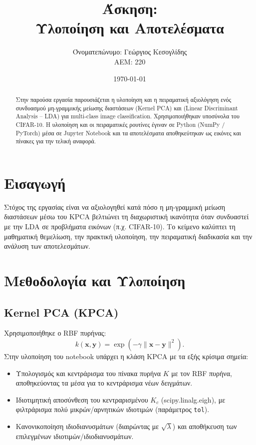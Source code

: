 \documentclass[a4paper,11pt]{article}
\title{Άσκηση: \lt{KPCA + LDA} \\ Υλοποίηση και Αποτελέσματα}
\author{Όνοματεπώνυμο: Γεώργιος Κεσογλίδης \\ ΑΕΜ: 220}
\date{\today}
\newcommand{\lt}[1]{\foreignlanguage{english}{#1}}
\begin{document}
\maketitle

\begin{abstract}
Στην παρούσα εργασία παρουσιάζεται η υλοποίηση και η πειραματική αξιολόγηση ενός συνδυασμού μη-γραμμικής μείωσης διαστάσεων (\lt{Kernel PCA}) και (\lt{Linear Discriminant Analysis -- LDA}) για \lt{multi-class image classification}. Χρησιμοποιήθηκαν υποσύνολα του \lt{CIFAR-10}. Η υλοποίηση και οι πειραματικές ρουτίνες έγιναν σε \lt{Python} (\lt{NumPy} / \lt{PyTorch}) μέσα σε \lt{Jupyter Notebook} και τα αποτελέσματα αποθηκεύτηκαν ως εικόνες και πίνακες για την τελική αναφορά.
\end{abstract}

\tableofcontents
\newpage

\section{Εισαγωγή}
Στόχος της εργασίας είναι να αξιολογηθεί κατά πόσο η μη-γραμμική μείωση διαστάσεων μέσω του \lt{KPCA} βελτιώνει τη διαχωριστική ικανότητα όταν συνδυαστεί με την \lt{LDA} σε προβλήματα εικόνων (π.χ. \lt{CIFAR-10}). Το κείμενο καλύπτει τη μαθηματική θεμελίωση, την πρακτική υλοποίηση, την πειραματική διαδικασία και την ανάλυση των αποτελεσμάτων.

\section{Μεθοδολογία και Υλοποίηση}
\subsection{\lt{Kernel PCA} (\lt{KPCA})}
Χρησιμοποιήθηκε ο \lt{RBF} πυρήνας:
\begin{equation}
k(\mathbf{x},\mathbf{y}) = \exp(-\gamma \|\mathbf{x}-\mathbf{y}\|^2).
\end{equation}
Στην υλοποίηση του \lt{notebook} υπάρχει η κλάση \lt{KPCA} με τα εξής κρίσιμα σημεία:
\begin{itemize}
    \item Υπολογισμός και κεντράρισμα του πίνακα πυρήνα $K$ με τον \lt{RBF} πυρήνα, αποθηκεύοντας τα μέσα για το κεντράρισμα νέων δειγμάτων.
    \item Ιδιοτιμητική αποσύνθεση του κεντραρισμένου $K_c$ (\lt{scipy.linalg.eigh}), με φιλτράρισμα πολύ μικρών/αρνητικών ιδιοτιμών (παράμετρος \texttt{tol}).
    \item Κανονικοποίηση ιδιοδιανυσμάτων (διαιρώντας με $\sqrt{\lambda}$) και αποθήκευση των επιλεγμένων ιδιοτιμών/ιδιοδιανυσμάτων.
\end{itemize}
\end{document}
